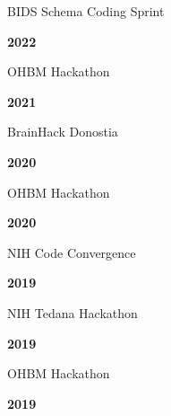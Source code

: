 \documentclass[10pt]{article}
\begin{document}
\begin{minipage}[t]{.85\linewidth}
	\flushleft
	\noindent
	BIDS Schema Coding Sprint
	\end{minipage}
	\hfill
	\begin{minipage}[t]{.15\linewidth}
	\flushright
	\noindent
	\textsc{\textbf{2022}}
\end{minipage}

\begin{minipage}[t]{.85\linewidth}
	\flushleft
	\noindent
	OHBM Hackathon
	\end{minipage}
	\hfill
	\begin{minipage}[t]{.15\linewidth}
	\flushright
	\noindent
	\textsc{\textbf{2021}}
\end{minipage}

\begin{minipage}[t]{.85\linewidth}
	\flushleft
	\noindent
	BrainHack Donostia
	\end{minipage}
	\hfill
	\begin{minipage}[t]{.15\linewidth}
	\flushright
	\noindent
	\textsc{\textbf{2020}}
\end{minipage}

\begin{minipage}[t]{.85\linewidth}
	\flushleft
	\noindent
	OHBM Hackathon
	\end{minipage}
	\hfill
	\begin{minipage}[t]{.15\linewidth}
	\flushright
	\noindent
	\textsc{\textbf{2020}}
\end{minipage}

\begin{minipage}[t]{.85\linewidth}
	\flushleft
	\noindent
	NIH Code Convergence
	\end{minipage}
	\hfill
	\begin{minipage}[t]{.15\linewidth}
	\flushright
	\noindent
	\textsc{\textbf{2019}}
\end{minipage}

\begin{minipage}[t]{.85\linewidth}
	\flushleft
	\noindent
	NIH Tedana Hackathon
	\end{minipage}
	\hfill
	\begin{minipage}[t]{.15\linewidth}
	\flushright
	\noindent
	\textsc{\textbf{2019}}
\end{minipage}

\begin{minipage}[t]{.85\linewidth}
	\flushleft
	\noindent
	OHBM Hackathon
	\end{minipage}
	\hfill
	\begin{minipage}[t]{.15\linewidth}
	\flushright
	\noindent
	\textsc{\textbf{2019}}
\end{minipage}
\end{document}

